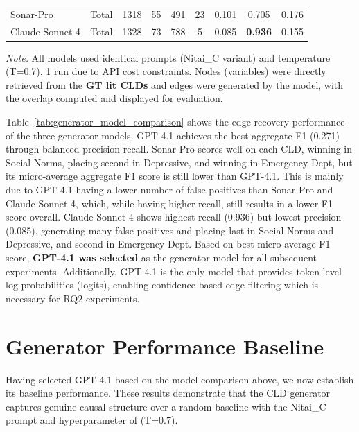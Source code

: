 \documentclass{article}
\begin{document}
\begin{table}[H]
\begin{threeparttable}
\begin{tabular}{llccccccc}
Sonar-Pro & Total & 1318 & 55 & 491 & 23 & 0.101 & 0.705 & 0.176 \\
Claude-Sonnet-4 & Total & 1328 & 73 & 788 & 5 & 0.085 & \textbf{0.936} & 0.155 \\
\bottomrule
\end{tabular}
\begin{tablenotes}
\small
\item \textit{Note.} All models used identical prompts (Nitai\_C variant) and temperature (T=0.7). 1 run due to API cost constraints. Nodes (variables) were directly retrieved from the \textbf{GT lit CLDs} and edges were generated by the model, with the overlap computed and displayed for evaluation. 

\end{tablenotes}
\end{threeparttable}
\end{table}


Table~\ref{tab:generator_model_comparison} shows the edge recovery performance of the three generator models. GPT-4.1 achieves the best aggregate F1 (0.271) through balanced precision-recall. Sonar-Pro scores well on each CLD, winning in Social Norms, placing second in Depressive, and winning in Emergency Dept, but its micro-average aggregate F1 score is still lower than GPT-4.1. This is mainly due to GPT-4.1 having a lower number of false positives than Sonar-Pro and Claude-Sonnet-4, which, while having higher recall, still results in a lower F1 score overall. Claude-Sonnet-4 shows highest recall (0.936) but lowest precision (0.085), generating many false positives and placing last in Social Norms and Depressive, and second in Emergency Dept. Based on best micro-average F1 score, \textbf{GPT-4.1 was selected} as the generator model for all subsequent experiments. Additionally, GPT-4.1 is the only model that provides token-level log probabilities (logits), enabling confidence-based edge filtering which is necessary for RQ2 experiments.

\section{Generator Performance Baseline}

Having selected GPT-4.1 based on the model comparison above, we now establish its baseline performance. These  results demonstrate that the CLD generator captures genuine causal structure over a random baseline with the Nitai_C prompt and hyperparameter of (T=0.7).
\end{document}
